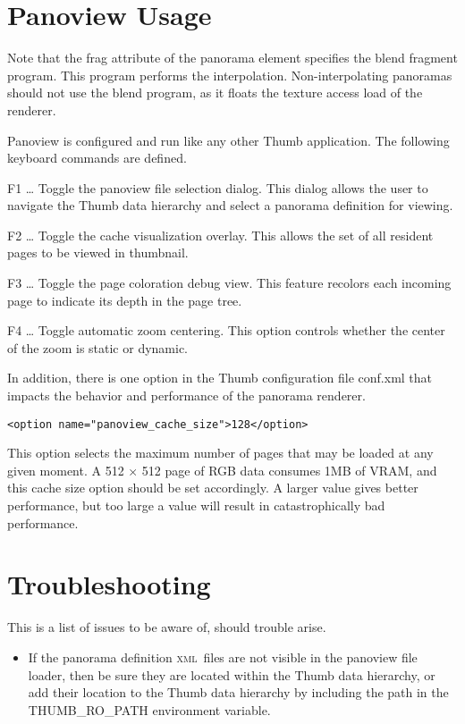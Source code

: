 \documentclass[article,twocolumn,10pt]{memoir}
\newcommand{\xml}     {\textsc{xml}}
\begin{document}
\begin{Spacing}{1.1}
\section{Panoview Usage}

Note that the frag attribute of the panorama element specifies the blend fragment program. This program performs the interpolation. Non-interpolating panoramas should not use the blend program, as it floats the texture access load of the renderer.

Panoview is configured and run like any other Thumb application. The following keyboard commands are defined.

F1 … Toggle the panoview file selection dialog. This dialog allows the user to navigate the Thumb data hierarchy and select a panorama definition for viewing.

F2 … Toggle the cache visualization overlay. This allows the set of all resident pages to be viewed in thumbnail.

F3 … Toggle the page coloration debug view. This feature recolors each incoming page to indicate its depth in the page tree.

F4 … Toggle automatic zoom centering. This option controls whether the center of the zoom is static or dynamic.

In addition, there is one option in the Thumb configuration file conf.xml that impacts the behavior and performance of the panorama renderer.

\begin{verbatim}
<option name="panoview_cache_size">128</option>
\end{verbatim}

This option selects the maximum number of pages that may be loaded at any given moment. A 512 × 512 page of RGB data consumes 1MB of VRAM, and this cache size option should be set accordingly. A larger value gives better performance, but too large a value will result in catastrophically bad performance.



\section{Troubleshooting}

This is a list of issues to be aware of, should trouble arise.

\begin{itemize}
\item If the panorama definition \xml\ files are not visible in the panoview file loader, then be sure they are located within the Thumb data hierarchy, or add their location to the Thumb data hierarchy by including the path in the THUMB\_RO\_PATH environment variable.


\end{itemize}
\end{Spacing}
\end{document}
